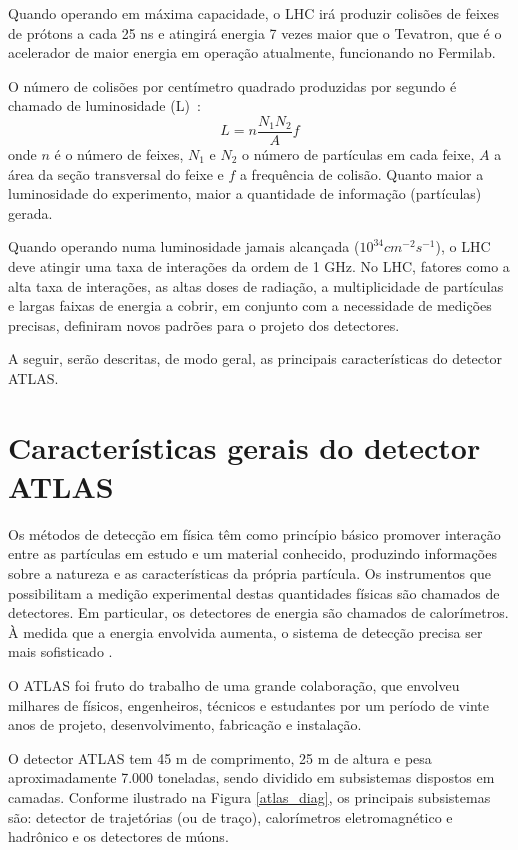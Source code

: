 Quando operando em máxima capacidade, o LHC irá produzir colisões de
feixes de prótons a cada 25 ns e atingirá energia 7 vezes maior que
o Tevatron, que é o acelerador de maior energia em operação
atual\-mente, funcionando no Fermilab.

O número de colisões por centímetro quadrado produzidas por segundo
é chamado de luminosidade (L)~\cite{book:martin:2006}:
\begin{equation}\label{lumi}
    L=n\frac{N_1N_2}{A}f
\end{equation}
onde $n$ é o número de feixes, $N_1$ e $N_2$ o número de partículas
em cada feixe, $A$ a área da seção transversal do feixe e $f$ a
frequência de colisão. Quanto maior a luminosidade do experimento,
maior a quantidade de informação (partículas) gerada.

Quando operando numa luminosidade jamais alcançada ($10^{34}cm^{-2}s^{-1}$), o LHC
deve atingir uma taxa de interações da ordem de 1 GHz. No LHC,
fatores como a alta taxa de interações, as altas doses de radiação,
a multiplicidade de partículas e largas faixas de ener\-gia a cobrir, em conjunto
com a necessidade de medições precisas, definiram novos padrões para
o projeto dos detectores.

A seguir, serão descritas, de modo geral, as principais
características do detector ATLAS.

\section{Características gerais do detector ATLAS}

Os métodos de detecção em física têm como princípio básico promover
interação entre as partículas em estudo e um material conhecido,
produzindo informações sobre a natureza e as características da
própria partícula. Os instrumentos que possibilitam a medição
experimental destas quantidades físicas são chamados de detectores.
Em particular, os detectores de energia são chamados de
calorímetros. À medida que a energia envolvida aumenta, o sistema de
detecção precisa ser mais sofisticado \cite{book:chung:2001}.

O ATLAS foi fruto do trabalho de uma grande colaboração, que envolveu
milhares de físicos, engenheiros, técnicos e estudantes por um
período de vinte anos de projeto, desenvolvimento, fabricação e
instalação.

O detector ATLAS tem 45 m de comprimento, 25 m de altura e pesa aproximadamente
7.000 toneladas, sendo dividido em subsistemas dispostos em camadas.
Conforme ilustrado na Figura \ref{atlas_diag}, os principais
subsistemas são: detector de trajetórias (ou de traço), calorímetros
eletromagnético e hadrônico e os detectores de múons. 

